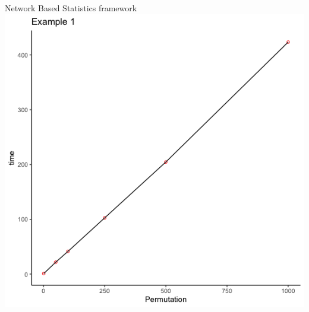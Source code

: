 \documentclass[english,aspectratio=169]{beamer}
\begin{document}
\begin{frame}{Network Based Statistics framework}%
  \centering
  \includegraphics[width=\textwidth]{NBR_example1.png}\\[0.1cm]
  
\end{frame}
\end{document}
